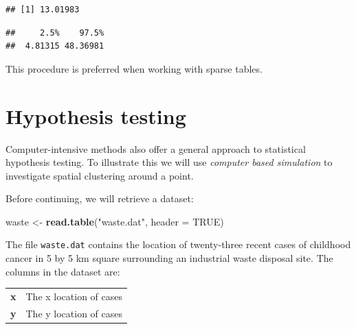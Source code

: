 \documentclass[12pt,a4paper]{book}
\newenvironment{Shaded}{\begin{snugshade}}{\end{snugshade}}
\newcommand{\DataTypeTok}[1]{\textcolor[rgb]{0.13,0.29,0.53}{#1}}
\newcommand{\KeywordTok}[1]{\textcolor[rgb]{0.13,0.29,0.53}{\textbf{#1}}}
\newcommand{\NormalTok}[1]{#1}
\newcommand{\OtherTok}[1]{\textcolor[rgb]{0.56,0.35,0.01}{#1}}
\newcommand{\StringTok}[1]{\textcolor[rgb]{0.31,0.60,0.02}{#1}}
\theoremstyle{definition}
\theoremstyle{definition}
\theoremstyle{definition}
\theoremstyle{remark}
\begin{document}
\begin{verbatim}
## [1] 13.01983
\end{verbatim}

\begin{verbatim}
##     2.5%    97.5% 
##  4.81315 48.36981
\end{verbatim}

This procedure is preferred when working with sparse tables.

\hypertarget{hypothesis-testing}{%
\section{Hypothesis testing}\label{hypothesis-testing}}

Computer-intensive methods also offer a general approach to statistical
hypothesis testing. To illustrate this we will use \emph{computer based
simulation} to investigate spatial clustering around a point.

Before continuing, we will retrieve a dataset:

\begin{Shaded}
\begin{Highlighting}[]
\NormalTok{waste <-}\StringTok{ }\KeywordTok{read.table}\NormalTok{(}\StringTok{"waste.dat"}\NormalTok{, }\DataTypeTok{header =} \OtherTok{TRUE}\NormalTok{)}
\end{Highlighting}
\end{Shaded}

The file \texttt{waste.dat} contains the location of twenty-three recent
cases of childhood cancer in 5 by 5 km square surrounding an industrial
waste disposal site. The columns in the dataset are:

\begin{longtable}[]{@{}ll@{}}
\toprule
\endhead
\begin{minipage}[t]{0.14\columnwidth}\raggedright
\textbf{x}\strut
\end{minipage} & \begin{minipage}[t]{0.41\columnwidth}\raggedright
The x location of cases\strut
\end{minipage}\tabularnewline
\begin{minipage}[t]{0.14\columnwidth}\raggedright
\textbf{y}\strut
\end{minipage} & \begin{minipage}[t]{0.41\columnwidth}\raggedright
The y location of cases\strut
\end{minipage}\tabularnewline
\bottomrule
\end{longtable}
\end{document}
